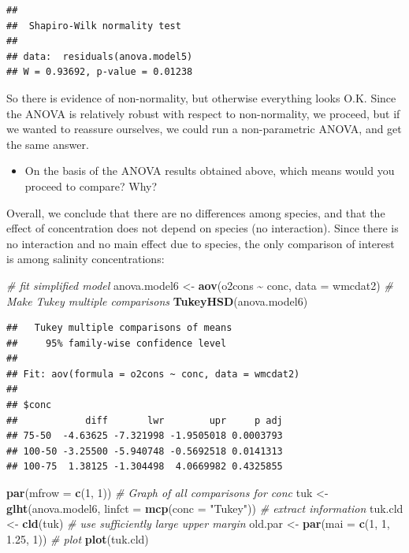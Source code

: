 \documentclass[
  12pt,
]{book}
\newenvironment{Shaded}{\begin{snugshade}}{\end{snugshade}}
\newcommand{\CommentTok}[1]{\textcolor[rgb]{0.56,0.35,0.01}{\textit{#1}}}
\newcommand{\DataTypeTok}[1]{\textcolor[rgb]{0.13,0.29,0.53}{#1}}
\newcommand{\DecValTok}[1]{\textcolor[rgb]{0.00,0.00,0.81}{#1}}
\newcommand{\FloatTok}[1]{\textcolor[rgb]{0.00,0.00,0.81}{#1}}
\newcommand{\KeywordTok}[1]{\textcolor[rgb]{0.13,0.29,0.53}{\textbf{#1}}}
\newcommand{\NormalTok}[1]{#1}
\newcommand{\OperatorTok}[1]{\textcolor[rgb]{0.81,0.36,0.00}{\textbf{#1}}}
\newcommand{\StringTok}[1]{\textcolor[rgb]{0.31,0.60,0.02}{#1}}
\providecommand{\tightlist}{%
  \setlength{\itemsep}{0pt}\setlength{\parskip}{0pt}}
\begin{document}
\begin{verbatim}
## 
##  Shapiro-Wilk normality test
## 
## data:  residuals(anova.model5)
## W = 0.93692, p-value = 0.01238
\end{verbatim}

So there is evidence of non-normality, but otherwise everything looks O.K. Since the ANOVA is relatively robust with respect to non-normality, we proceed, but if we wanted to reassure ourselves, we could run a non-parametric ANOVA, and get the same answer.

\begin{itemize}
\tightlist
\item
  On the basis of the ANOVA results obtained above, which means would you proceed to compare? Why?
\end{itemize}

Overall, we conclude that there are no differences among species, and that the effect of concentration does not depend on species (no interaction). Since there is no interaction and no main effect due to species, the only comparison of interest is among salinity concentrations:

\begin{Shaded}
\begin{Highlighting}[]
\CommentTok{\# fit simplified model}
\NormalTok{anova.model6 \textless{}{-}}\StringTok{ }\KeywordTok{aov}\NormalTok{(o2cons }\OperatorTok{\textasciitilde{}}\StringTok{ }\NormalTok{conc, }\DataTypeTok{data =}\NormalTok{ wmcdat2)}
\CommentTok{\# Make Tukey multiple comparisons}
\KeywordTok{TukeyHSD}\NormalTok{(anova.model6)}
\end{Highlighting}
\end{Shaded}

\begin{verbatim}
##   Tukey multiple comparisons of means
##     95% family-wise confidence level
## 
## Fit: aov(formula = o2cons ~ conc, data = wmcdat2)
## 
## $conc
##            diff       lwr        upr     p adj
## 75-50  -4.63625 -7.321998 -1.9505018 0.0003793
## 100-50 -3.25500 -5.940748 -0.5692518 0.0141313
## 100-75  1.38125 -1.304498  4.0669982 0.4325855
\end{verbatim}

\begin{Shaded}
\begin{Highlighting}[]
\KeywordTok{par}\NormalTok{(}\DataTypeTok{mfrow =} \KeywordTok{c}\NormalTok{(}\DecValTok{1}\NormalTok{, }\DecValTok{1}\NormalTok{))}
\CommentTok{\# Graph of all comparisons for conc}
\NormalTok{tuk \textless{}{-}}\StringTok{ }\KeywordTok{glht}\NormalTok{(anova.model6, }\DataTypeTok{linfct =} \KeywordTok{mcp}\NormalTok{(}\DataTypeTok{conc =} \StringTok{"Tukey"}\NormalTok{))}
\CommentTok{\# extract information}
\NormalTok{tuk.cld \textless{}{-}}\StringTok{ }\KeywordTok{cld}\NormalTok{(tuk)}
\CommentTok{\# use sufficiently large upper margin}
\NormalTok{old.par \textless{}{-}}\StringTok{ }\KeywordTok{par}\NormalTok{(}\DataTypeTok{mai =} \KeywordTok{c}\NormalTok{(}\DecValTok{1}\NormalTok{, }\DecValTok{1}\NormalTok{, }\FloatTok{1.25}\NormalTok{, }\DecValTok{1}\NormalTok{))}
\CommentTok{\# plot}
\KeywordTok{plot}\NormalTok{(tuk.cld)}
\end{Highlighting}
\end{Shaded}
\end{document}
